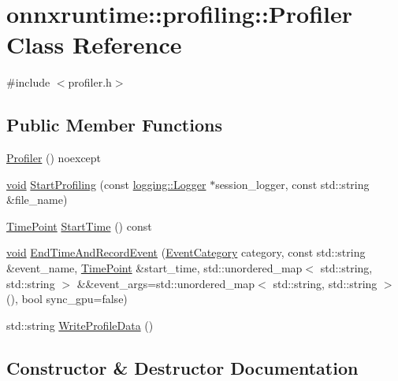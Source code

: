 \hypertarget{classonnxruntime_1_1profiling_1_1Profiler}{}\section{onnxruntime\+:\+:profiling\+:\+:Profiler Class Reference}
\label{classonnxruntime_1_1profiling_1_1Profiler}


{\ttfamily \#include $<$profiler.\+h$>$}

\subsection*{Public Member Functions}
\begin{DoxyCompactItemize}
\item 
\mbox{\hyperlink{classonnxruntime_1_1profiling_1_1Profiler_aaaad4b91eaed51fe42285e4bc7905563}{Profiler}} () noexcept
\item 
\mbox{\hyperlink{mlasi_8h_a88f941d423cb2a819b70a1358982b1a6}{void}} \mbox{\hyperlink{classonnxruntime_1_1profiling_1_1Profiler_a3629a36c6c2d6ae848f7683999f64f35}{Start\+Profiling}} (const \mbox{\hyperlink{classonnxruntime_1_1logging_1_1Logger}{logging\+::\+Logger}} $\ast$session\+\_\+logger, const std\+::string \&file\+\_\+name)
\item 
\mbox{\hyperlink{namespaceonnxruntime_a9b5a17a572f7c3cf77f4892542bd7153}{Time\+Point}} \mbox{\hyperlink{classonnxruntime_1_1profiling_1_1Profiler_a273e1d74c3db999223080120ea89705d}{Start\+Time}} () const
\item 
\mbox{\hyperlink{mlasi_8h_a88f941d423cb2a819b70a1358982b1a6}{void}} \mbox{\hyperlink{classonnxruntime_1_1profiling_1_1Profiler_a4dc59c0289a90e418afdca6aba5e3488}{End\+Time\+And\+Record\+Event}} (\mbox{\hyperlink{namespaceonnxruntime_1_1profiling_acbb1d7474c26b32c5bfef2ce1ab63734}{Event\+Category}} category, const std\+::string \&event\+\_\+name, \mbox{\hyperlink{namespaceonnxruntime_a9b5a17a572f7c3cf77f4892542bd7153}{Time\+Point}} \&start\+\_\+time, std\+::unordered\+\_\+map$<$ std\+::string, std\+::string $>$ \&\&event\+\_\+args=std\+::unordered\+\_\+map$<$ std\+::string, std\+::string $>$(), bool sync\+\_\+gpu=false)
\item 
std\+::string \mbox{\hyperlink{classonnxruntime_1_1profiling_1_1Profiler_a90a8c013fd44413ddb1898087f22ae14}{Write\+Profile\+Data}} ()
\end{DoxyCompactItemize}


\subsection{Constructor \& Destructor Documentation}
\mbox{\label{classonnxruntime_1_1profiling_1_1Profiler_aaaad4b91eaed51fe42285e4bc7905563}} 
